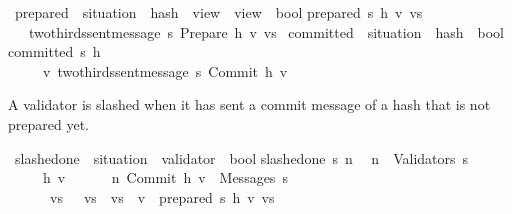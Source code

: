\documentclass{beamer}
\begin{document}
\begin{frame}
\isamarkupfalse%
\ prepared\ {\isacharcolon}{\isacharcolon}\ {\isachardoublequoteopen}situation\ {\isasymRightarrow}\ hash\ {\isasymRightarrow}\ view\ {\isasymRightarrow}\ view\ {\isasymRightarrow}\ bool{\isachardoublequoteclose}\isanewline
{}\isanewline
{\isachardoublequoteopen}prepared\ s\ h\ v\ vs\ {\isacharequal}\isanewline
\ \ \ {\isacharparenleft}two{\isacharunderscore}thirds{\isacharunderscore}sent{\isacharunderscore}message\ s\ {\isacharparenleft}Prepare\ {\isacharparenleft}h{\isacharcomma}\ v{\isacharcomma}\ vs{\isacharparenright}{\isacharparenright}{\isacharparenright}{\isachardoublequoteclose}%
\vfill
{}\isamarkupfalse%
\ committed\ {\isacharcolon}{\isacharcolon}\ {\isachardoublequoteopen}situation\ {\isasymRightarrow}\ hash\ {\isasymRightarrow}\ bool{\isachardoublequoteclose}\isanewline
{}\isanewline
           {\isachardoublequoteopen}committed\ s\ h\ {\isacharequal}\\
           \ \ \ \ {\isacharparenleft}{\isasymexists}\ v{\isachardot}\ two{\isacharunderscore}thirds{\isacharunderscore}sent{\isacharunderscore}message\ s\ {\isacharparenleft}Commit\ {\isacharparenleft}h{\isacharcomma}\ v{\isacharparenright}{\isacharparenright}{\isacharparenright}{\isachardoublequoteclose}%
\isamarkuptrue%
%
\end{frame}

\begin{frame}
\begin{isamarkuptext}%
[i] A validator is slashed when it has sent a commit message of a hash
      that is not prepared yet.%
\end{isamarkuptext}\isamarkuptrue%
\isamarkupfalse%
\ slashed{\isacharunderscore}one\ {\isacharcolon}{\isacharcolon}\ {\isachardoublequoteopen}situation\ {\isasymRightarrow}\ validator\ {\isasymRightarrow}\ bool{\isachardoublequoteclose}\isanewline
{}\isanewline
{\isachardoublequoteopen}slashed{\isacharunderscore}one\ s\ n\ {\isacharequal}\isanewline
\ {\isacharparenleft}n\ {\isasymin}\ Validators\ s\ {\isasymand}\isanewline
\ \ \ \ {\isacharparenleft}{\isasymexists}\ h\ v{\isachardot}\isanewline
\ \ \ \ \ \ {\isacharparenleft}{\isacharparenleft}n{\isacharcomma}\ Commit\ {\isacharparenleft}h{\isacharcomma}\ v{\isacharparenright}{\isacharparenright}\ {\isasymin}\ Messages\ s\ {\isasymand}\isanewline
\ \ \ \ {\isacharparenleft}{\isasymnot}\ {\isacharparenleft}{\isasymexists}\ vs{\isachardot}\ {\isacharminus}{}\ {\isasymle}\ vs\ {\isasymand}\ vs\ {\isacharless}\ v\ {\isasymand}\ prepared\ s\ h\ v\ vs{\isacharparenright}\ {\isacharparenright}{\isacharparenright}{\isacharparenright}{\isacharparenright}{\isachardoublequoteclose}%
\end{frame}
\end{document}
